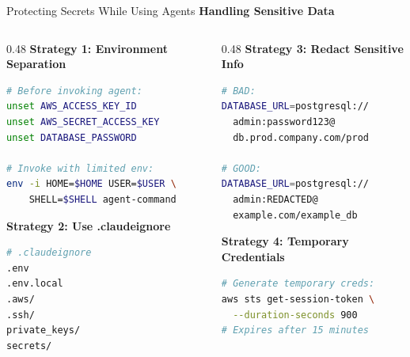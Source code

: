 \documentclass[aspectratio=169,11pt]{beamer}
\begin{document}
\begin{frame}[fragile]{Protecting Secrets While Using Agents}
    \textbf{Handling Sensitive Data}

    \begin{columns}[T]
        \begin{column}{0.48\textwidth}
            \textbf{Strategy 1: Environment Separation}
            \begin{lstlisting}[language=Bash]
# Before invoking agent:
unset AWS_ACCESS_KEY_ID
unset AWS_SECRET_ACCESS_KEY
unset DATABASE_PASSWORD

# Invoke with limited env:
env -i HOME=$HOME USER=$USER \
    SHELL=$SHELL agent-command
            \end{lstlisting}

            \textbf{Strategy 2: Use .claudeignore}
            \begin{lstlisting}[language=Bash]
# .claudeignore
.env
.env.local
.aws/
.ssh/
private_keys/
secrets/
            \end{lstlisting}
        \end{column}
        \begin{column}{0.48\textwidth}
            \textbf{Strategy 3: Redact Sensitive Info}
            \begin{lstlisting}[language=Bash]
# BAD:
DATABASE_URL=postgresql://
  admin:password123@
  db.prod.company.com/prod

# GOOD:
DATABASE_URL=postgresql://
  admin:REDACTED@
  example.com/example_db
            \end{lstlisting}

            \textbf{Strategy 4: Temporary Credentials}
            \begin{lstlisting}[language=Bash]
# Generate temporary creds:
aws sts get-session-token \
  --duration-seconds 900
# Expires after 15 minutes
            \end{lstlisting}
        \end{column}
    \end{columns}
\end{frame}
\end{document}
